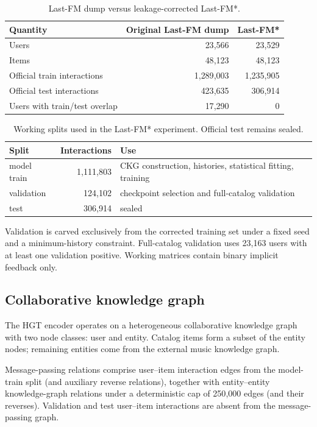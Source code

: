 \begin{table}[htbp]
\centering
\caption{Last-FM dump versus leakage-corrected Last-FM*.}
\label{tab:lastfm-star-scale}
\begin{tabular}{lrr}
\toprule
Quantity & Original Last-FM dump & Last-FM* \\
\midrule
Users & 23{,}566 & 23{,}529 \\
Items & 48{,}123 & 48{,}123 \\
Official train interactions & 1{,}289{,}003 & 1{,}235{,}905 \\
Official test interactions & 423{,}635 & 306{,}914 \\
Users with train/test overlap & 17{,}290 & 0 \\
\bottomrule
\end{tabular}
\end{table}

\begin{table}[htbp]
\centering
\caption{Working splits used in the Last-FM* experiment. Official test remains sealed.}
\label{tab:lastfm-splits}
\begin{tabular}{lrl}
\toprule
Split & Interactions & Use \\
\midrule
model train & 1{,}111{,}803 & CKG construction, histories, statistical fitting, training \\
validation & 124{,}102 & checkpoint selection and full-catalog validation \\
test & 306{,}914 & sealed \\
\bottomrule
\end{tabular}
\end{table}

Validation is carved exclusively from the corrected training set under a fixed seed and a minimum-history constraint.
Full-catalog validation uses 23{,}163 users with at least one validation positive.
Working matrices contain binary implicit feedback only.

\subsection{Collaborative knowledge graph}
\label{sec:lastfm-ckg}

The HGT encoder operates on a heterogeneous collaborative knowledge graph with two node classes: user and entity.
Catalog items form a subset of the entity nodes; remaining entities come from the external music knowledge graph.

Message-passing relations comprise user--item interaction edges from the model-train split (and auxiliary reverse relations), together with entity--entity knowledge-graph relations under a deterministic cap of 250{,}000 edges (and their reverses).
Validation and test user--item interactions are absent from the message-passing graph.

